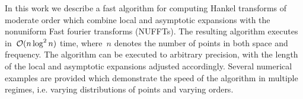 In this work we describe a fast algorithm for computing Hankel transforms of
moderate order which combine local and asymptotic expansions with the nonuniform
Fast fourier transforms (NUFFTs). The resulting algorithm executes in~$\mathcal{O} (n
\log^2 n)$ time, where~$n$ denotes the number of points in both space and
frequency.  The algorithm can be executed to arbitrary precision, with the
length of the local and asymptotic expansions adjusted accordingly. Several
numerical examples are provided which demonstrate the speed of the algorithm in
multiple regimes, i.e. varying distributions of points and varying orders.

